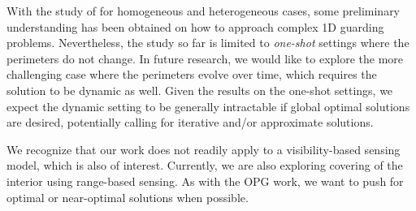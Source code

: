 With the study of \opg \cite{FenHanGaoYu19RSS} for homogeneous and 
heterogeneous cases, some preliminary understanding has been 
obtained on how to approach complex 1D guarding problems. 
Nevertheless, the study so far is limited to {\em one-shot} settings
where the perimeters do not change. In future research, we would like 
to explore the more challenging case where the perimeters evolve 
over time, which requires the solution to be dynamic as well. Given 
the results on the one-shot settings, we expect the dynamic setting
to be generally intractable if global optimal solutions are desired, 
potentially calling for iterative and/or approximate solutions. 

We recognize that our work 
does not readily apply to a visibility-based sensing model, which is also 
of interest. Currently, we are also exploring covering of the interior
using range-based sensing. As with the OPG work, we want to push for 
optimal or near-optimal solutions when possible.
\vspace*{-1mm}
